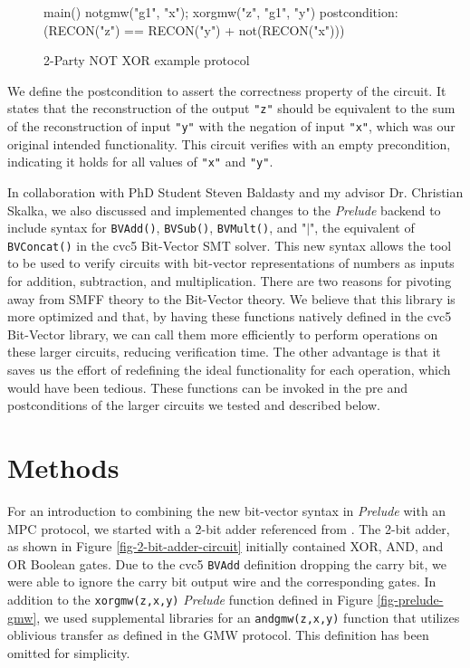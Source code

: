 \documentclass{article}
\begin{document}
\begin{figure}
{\footnotesize
\begin{verbatimtab}
main() {
   notgmw("g1", "x");
   xorgmw("z", "g1", "y")
} 
postcondition: (RECON("z") == RECON("y") + not(RECON("x")))
\end{verbatimtab}
}
\caption{2-Party NOT XOR example protocol}
\label{fig-2-party-not-xor-code}
\end{figure}
We define the postcondition to assert the correctness property of the circuit. It states that the reconstruction of the output \texttt{"z"} should be equivalent to the sum of the reconstruction of input \texttt{"y"} with the negation of input \texttt{"x"}, which was our original intended functionality. This circuit verifies with an empty precondition, indicating it holds for all values of \texttt{"x"} and \texttt{"y"}. 

In collaboration with PhD Student Steven Baldasty and my advisor Dr. Christian Skalka, we also discussed and implemented changes to the \textit{Prelude} backend to include syntax for \texttt{BVAdd()}, \texttt{BVSub()}, \texttt{BVMult()}, and "\texttt{$\vert$}", the equivalent of \texttt{BVConcat()} in the cvc5 Bit-Vector SMT solver. This new syntax allows the tool to be used to verify circuits with bit-vector representations of numbers as inputs for addition, subtraction, and multiplication. There are two reasons for pivoting away from SMFF theory to the Bit-Vector theory. We believe that this library is more optimized and that, by having these functions natively defined in the cvc5 Bit-Vector library, we can call them more efficiently to perform operations on these larger circuits, reducing verification time. The other advantage is that it saves us the effort of redefining the ideal functionality for each operation, which would have been tedious. These functions can be invoked in the pre and postconditions of the larger circuits we tested and described below. 

\section{Methods}
\label{sec:Methods}
For an introduction to combining the new bit-vector syntax in \textit{Prelude} with an MPC protocol, we started with a 2-bit adder referenced from \cite{2-bit-adder}. The 2-bit adder, as shown in Figure \ref{fig-2-bit-adder-circuit} initially contained XOR, AND, and OR Boolean gates. Due to the cvc5 \texttt{BVAdd} definition dropping the carry bit, we were able to ignore the carry bit output wire and the corresponding gates. In addition to the \texttt{xorgmw(z,x,y)} \textit{Prelude} function defined in Figure \ref{fig-prelude-gmw}, we used supplemental libraries for an \texttt{andgmw(z,x,y)} function that utilizes oblivious transfer as defined in the GMW protocol. This definition has been omitted for simplicity.
\end{document}
